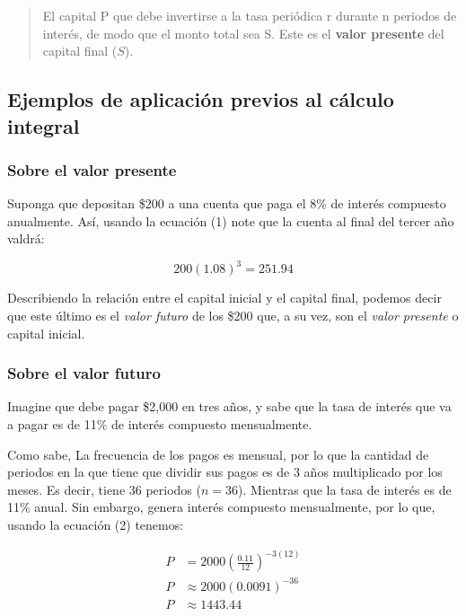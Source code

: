 \documentclass{article}
\begin{document}
            \begin{quote}
                El capital P que debe invertirse a la tasa periódica r durante n periodos de interés, de modo que el monto total sea S. Este es el \textbf{valor presente} del capital final ($S$).
            \end{quote}

        \subsection{Ejemplos de aplicación previos al cálculo integral}

            \subsubsection{Sobre el valor presente}

                Suponga que depositan \$200 a una cuenta que paga el 8\% de interés compuesto anualmente. Así, usando la ecuación (1) note que la cuenta al final del tercer año valdrá:

                \begin{equation*}
                    200(1.08)^{3} = 251.94
                \end{equation*}

                Describiendo la relación entre el capital inicial y el capital final, podemos decir que este último es el \textit{valor futuro} de los \$200 que, a su vez, son el \textit{valor presente} o capital inicial.

            \subsubsection{Sobre el valor futuro}

                Imagine que debe pagar \$2,000 en tres años, y sabe que la tasa de interés que va a pagar es de 11\% de interés compuesto mensualmente.
                
                Como sabe, La frecuencia de los pagos es mensual, por lo que la cantidad de periodos en la que tiene que dividir sus pagos es de 3 años multiplicado por los meses. Es decir, tiene 36 periodos ($n = 36$). Mientras que la tasa de interés es de 11\% anual. Sin embargo, genera interés compuesto mensualmente, por lo que, usando la ecuación (2) tenemos:

                \begin{equation*}
                \begin{split}
                    P &= 2000 \left(\frac{0.11}{12}\right)^{-3(12)} \\
                    P &\approx 2000(0.0091)^{-36} \\
                    P &\approx 1443.44
                \end{split}
                \end{equation*}
\end{document}
